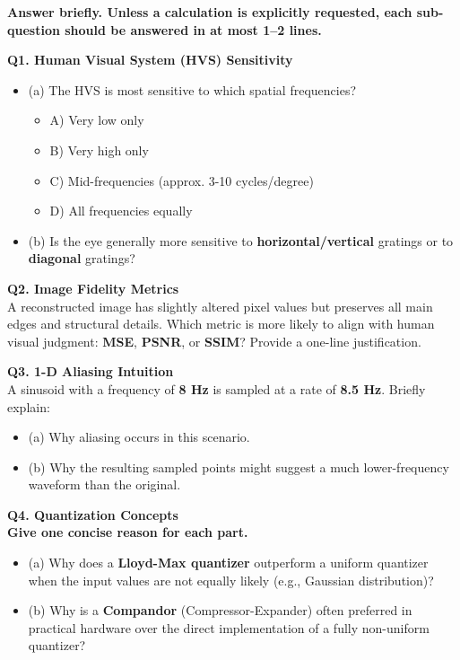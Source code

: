 \LTR

\textbf{Answer briefly. Unless a calculation is explicitly requested, each sub-question should be answered in at most 1--2 lines.}

\vspace{1.5em}
\noindent \textbf{Q1. Human Visual System (HVS) Sensitivity}
\begin{itemize}
    \item (a) The HVS is most sensitive to which spatial frequencies?
    \begin{itemize}
        \item[$\circ$] A) Very low only
        \item[$\circ$] B) Very high only
        \item[$\circ$] C) Mid-frequencies (approx. 3-10 cycles/degree)
        \item[$\circ$] D) All frequencies equally
    \end{itemize}
    \item (b) Is the eye generally more sensitive to \textbf{horizontal/vertical} gratings or to \textbf{diagonal} gratings?
\end{itemize}

\vspace{1.5em}
\noindent \textbf{Q2. Image Fidelity Metrics}\\
A reconstructed image has slightly altered pixel values but preserves all main edges and structural details. Which metric is more likely to align with human visual judgment: \textbf{MSE}, \textbf{PSNR}, or \textbf{SSIM}? Provide a one-line justification.

\vspace{1.5em}
\noindent \textbf{Q3. 1-D Aliasing Intuition}\\
A sinusoid with a frequency of \textbf{8 Hz} is sampled at a rate of \textbf{8.5 Hz}. Briefly explain:
\begin{itemize}
    \item (a) Why aliasing occurs in this scenario.
    \item (b) Why the resulting sampled points might suggest a much lower-frequency waveform than the original.
\end{itemize}

\vspace{1.5em}
\noindent \textbf{Q4. Quantization Concepts}\\
\hspace*{1.5em}\textbf{Give one concise reason for each part.}
\begin{itemize}
    \item (a) Why does a \textbf{Lloyd-Max quantizer} outperform a uniform quantizer when the input values are not equally likely (e.g., Gaussian distribution)?
    \item (b) Why is a \textbf{Compandor} (Compressor-Expander) often preferred in practical hardware over the direct implementation of a fully non-uniform quantizer?
\end{itemize}

\RTL